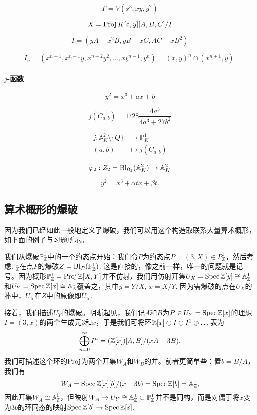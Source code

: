 \begin{exe}\label{exe:4.42}
	\nottran
\end{exe}


\[
	\Gamma=V(x^3,xy,y^2)
\]

\[
	X=\operatorname{Proj} K[x,y][A,B,C]/I
\]

\[
	I=(yA-x^2B,yB-xC,AC-xB^2)
\]

\[
	I_n=(x^{n+1},x^{n-1}y,x^{n-2}y^2,\dots,xy^{n-1},y^n)=
	(x,y)^n\cap (x^{n+1},y).
\]

\paragraph*{$j$-函数}

\[
	y^2=x^3+ax+b
\]

\[
	j(C_{a,b})=1728\frac{4a^3}{4a^3+27b^2}
\]

\[
	\begin{aligned}
		j:\mathbb A_K^2\setminus \{Q\}&\longrightarrow \mathbb P_K^1 \\
		(a,b)&\longmapsto j(C_{a,b})
	\end{aligned}
\]

\[
	\varphi_2:Z_2=\operatorname{Bl}_{\Omega_2}(\mathbb A_K^2)\to \mathbb A_K^2
\]

\[
	y^2=x^3+\alpha tx+\beta t.
\]

\subsection{算术概形的爆破}\label{s:4.2.4}

因为我们已经如此一般地定义了爆破，我们可以用这个构造取联系大量算术概形，如下面的例子与习题所示。

我们从爆破$\mathbb P_{\mathbb Z}^1$中的一个约态点开始：我们令$P$为约态点$P=(3,X)\in P_{\mathbb Z}^1$，然后考虑$\mathbb P_{\mathbb Z}^1$在点$P$的爆破$Z=\operatorname{Bl}_P(\mathbb P_{\mathbb Z}^1)$. 这是直接的，像之前一样，唯一的问题就是记号。因为概形$\mathbb P_{\mathbb Z}^1=\operatorname{Proj} \mathbb{Z}[X,Y]$并不仿射，我们用仿射开集$U_X=\operatorname{Spec} \mathbb{Z}[y]\cong \mathbb A_{\mathbb Z}^1$和$U_Y=\operatorname{Spec} \mathbb{Z}[x]\cong \mathbb A_{\mathbb Z}^1$覆盖之，其中$y=Y/X$, $x=X/Y$. 因为需爆破的点在$U_X$的补中，$U_X$在$Z$中的原像即$U_X$.

接着，我们描述$U_Y$的爆破。明晰起见，我们记$A$和$B$为$P\in U_Y=\operatorname{Spec} \mathbb{Z}[x]$的理想$I=(3,x)$的两个生成元$3$和$x$，于是我们可将环$\mathbb{Z}[x]\oplus I\oplus I^2\oplus \dots$表为
\[
	\bigoplus_{n=0}^\infty I^n=(\mathbb{Z}[x])[A,B]/(xA-3B).
\]%
我们可描述这个环的$\operatorname{Proj}$为两个开集$W_A$和$W_B$的并。前者更简单些：置$b=B/A$，我们有
\[
	W_A=\operatorname{Spec} \mathbb{Z}[x][b]/(x-3b)=\operatorname{Spec} \mathbb{Z}[b]=\mathbb A_{\mathbb{Z}}^1,
\]
因此开集$W_A\cong \mathbb A_{\mathbb Z}^1$，但映射$W_A\to U_Y\cong \mathbb A_{\mathbb{Z}}^1\subset \mathbb P_{\mathbb{Z}}^1$并不是同构，而是对偶于将$x$变为$3b$的环同态的映射$\operatorname{Spec} \mathbb{Z}[b]\to \operatorname{Spec} \mathbb{Z}[x]$.

